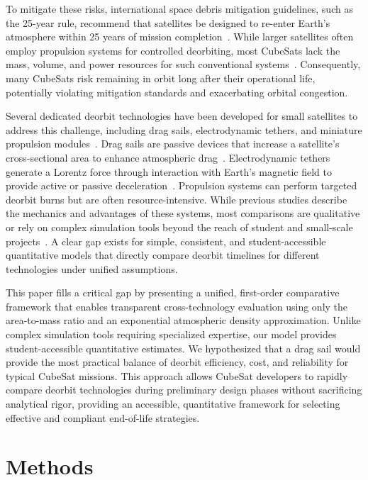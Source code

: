 \documentclass[11pt,a4paper]{article}
\begin{document}
To mitigate these risks, international space debris mitigation guidelines, such as the 25-year rule, recommend that satellites be designed to re-enter Earth's atmosphere within 25 years of mission completion~\cite{iadc}. While larger satellites often employ propulsion systems for controlled deorbiting, most CubeSats lack the mass, volume, and power resources for such conventional systems~\cite{lemmer,selva}. Consequently, many CubeSats risk remaining in orbit long after their operational life, potentially violating mitigation standards and exacerbating orbital congestion.

Several dedicated deorbit technologies have been developed for small satellites to address this challenge, including drag sails, electrodynamic tethers, and miniature propulsion modules~\cite{sanchez,altaf}. Drag sails are passive devices that increase a satellite's cross-sectional area to enhance atmospheric drag~\cite{zhang,chen}. Electrodynamic tethers generate a Lorentz force through interaction with Earth's magnetic field to provide active or passive deceleration~\cite{forward,ohkawa,sarego}. Propulsion systems can perform targeted deorbit burns but are often resource-intensive. While previous studies describe the mechanics and advantages of these systems, most comparisons are qualitative or rely on complex simulation tools beyond the reach of student and small-scale projects~\cite{nasa2022,altaf}. A clear gap exists for simple, consistent, and student-accessible quantitative models that directly compare deorbit timelines for different technologies under unified assumptions.

This paper fills a critical gap by presenting a unified, first-order comparative framework that enables transparent cross-technology evaluation using only the area-to-mass ratio and an exponential atmospheric density approximation. Unlike complex simulation tools requiring specialized expertise, our model provides student-accessible quantitative estimates. We hypothesized that a drag sail would provide the most practical balance of deorbit efficiency, cost, and reliability for typical CubeSat missions. This approach allows CubeSat developers to rapidly compare deorbit technologies during preliminary design phases without sacrificing analytical rigor, providing an accessible, quantitative framework for selecting effective and compliant end-of-life strategies.

\section{Methods}
\end{document}
